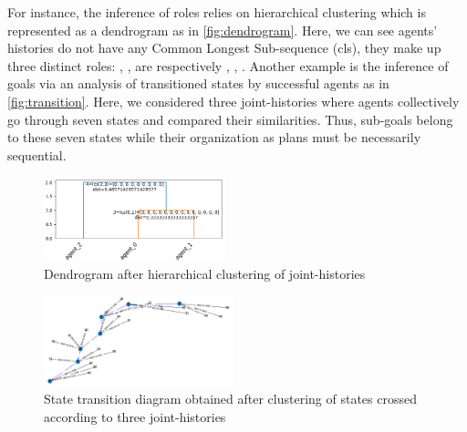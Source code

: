 \documentclass[doubleblind]{ecai}
\begin{document}
For instance, the inference of roles relies on hierarchical clustering which is represented as a dendrogram as in \autoref{fig:dendrogram}. Here, we can see agents' histories do not have any Common Longest Sub-sequence (cls), they make up three distinct roles: , ,  are respectively , , .
Another example is the inference of goals via an analysis of transitioned states by successful agents as in \autoref{fig:transition}. Here, we considered three joint-histories where agents collectively go through seven states and compared their similarities. Thus, sub-goals belong to these seven states while their organization as plans must be necessarily sequential.

\begin{figure}[!]
    \centering
    \includegraphics[width=0.47\textwidth]{academic_contributions/Organizational_MARL/ECAI_demo/figures/dendrogram.png}
    
    \caption{Dendrogram after hierarchical clustering of joint-histories}

    \phantom{X}
    
    \label{fig:dendrogram}
\end{figure}

\begin{figure}[h!]
    \centering
    \includegraphics[width=0.49\textwidth]{academic_contributions/Organizational_MARL/ECAI_demo/figures/transition.png}
    
    \caption{State transition diagram obtained after clustering of states crossed according to three joint-histories}
    \label{fig:transition}

    \phantom{X}
    
\end{figure}
\end{document}
